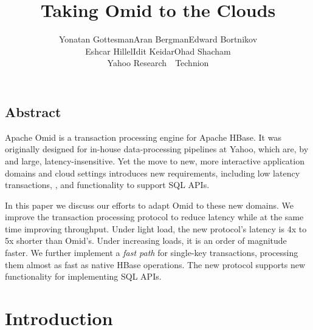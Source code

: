 \documentclass[letterpaper,twocolumn,10pt]{article}
\newcommand{\inred}[1]{{\color{red}{#1}}}
\newcommand{\remove}[1]{}
\newcommand{\tb}{\hspace{10mm}}
\begin{document}
\date{}

\title{Taking Omid to the Clouds}


\author{
{\rm Yonatan Gottesman\footnotemark[1]\tb Aran Bergman\footnotemark[2]\tb   Edward Bortnikov\footnotemark[1] }\\ 
{\rm Eshcar Hillel\footnotemark[1]\tb Idit Keidar\footnotemark[1] \footnotemark[2]\tb Ohad Shacham\footnotemark[1]}\\
	\footnotemark[1] Yahoo Research\ \ \footnotemark[2] Technion  \\ [2mm]
} %


\maketitle




\subsection*{Abstract}

Apache Omid is a transaction processing engine for Apache HBase. 
It was originally designed for in-house data-processing pipelines at Yahoo, which are, by and large, latency-insensitive. 
Yet the move to new, more interactive application domains and cloud settings introduces new requirements, including  
low latency transactions, \inred{multi-tenancy}, and functionality to support SQL APIs. 

In this paper we discuss our efforts to adapt Omid to these new domains. We improve the transaction processing protocol to 
reduce latency while at the same time improving throughput. Under light load, the new protocol's latency is 4x to 5x shorter 
than Omid's. Under increasing loads, it is an order of magnitude faster.
We further implement a \emph{fast path} for single-key transactions, 
processing them almost as fast as native HBase operations.
The new protocol supports \inred{multi-tenancy as well as} new  functionality for implementing SQL APIs.

\section{Introduction} \label{sec:intro}
 
\end{document}
